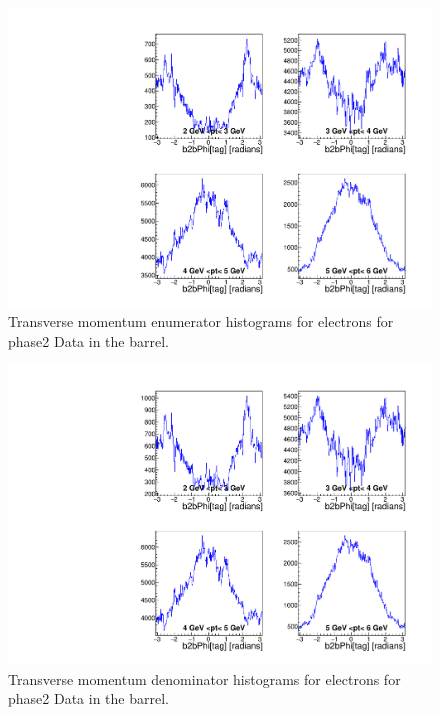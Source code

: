 \documentclass[a4paper,11pt,twosided,final,german,openbib,pdftex,listof=totoc,bibliography=totoc]{scrbook}
\begin{document}
\begin{appendix}
\begin{figure}[!htbp]
	\centering
	\includegraphics[width=\textwidth]{Plots/master/xPtMPhiemBarrelE_Data}
	\caption[Transverse Momentum $\phi$ Electron Barrel Enumerator Histogram Phase2 Data]{Transverse momentum enumerator histograms for electrons for phase2 Data in the barrel.}
	\label{plt:PtMPhiemBarrelE_Data}
\end{figure}

\begin{figure}[!htbp]
	\centering
	\includegraphics[width=\textwidth]{Plots/master/xPtMPhiemBarrelD_Data}
	\caption[Transverse Momentum $\phi$ Electron Barrel Denominator Histogram Phase2 Data]{Transverse momentum denominator histograms for electrons for phase2 Data in the barrel.}
	\label{plt:PtMPhiemBarrelD_Data}
\end{figure}




\end{appendix}
\end{document}
